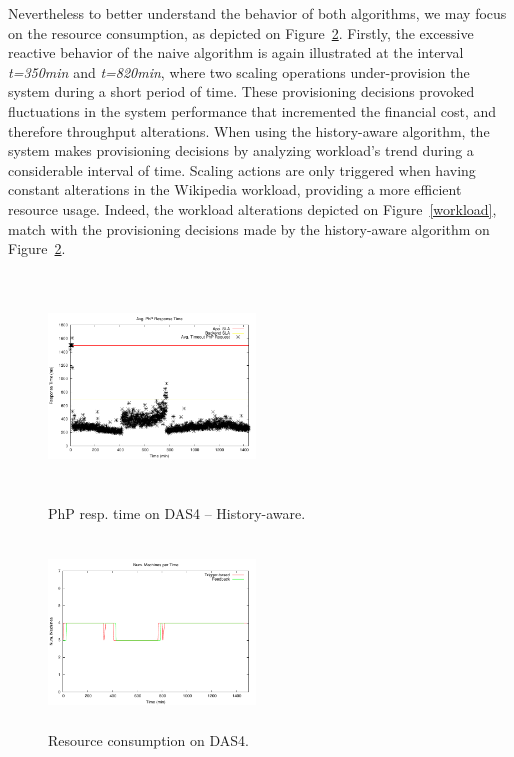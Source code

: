 Nevertheless to better understand the behavior of both algorithms, we may focus on the resource consumption, as depicted on Figure~\ref{resComDas4}. Firstly, the excessive reactive behavior of the naive algorithm is again illustrated at the interval \emph{t=350min} and \emph{t=820min}, where two scaling operations under-provision the system during a short period of time. These provisioning decisions provoked fluctuations in the system performance that incremented the financial cost, and therefore throughput alterations. When using the history-aware algorithm, the system makes provisioning decisions by analyzing workload's trend during a considerable interval of time. Scaling actions are only triggered when having constant alterations in the Wikipedia workload, providing a more efficient resource usage. Indeed, the workload alterations depicted on Figure~\ref{workload}, match with the provisioning decisions made by the history-aware algorithm on Figure~\ref{resComDas4}.

\begin{figure}
\begin{center}
\includegraphics[width=0.49\textwidth, height=6cm]{./images/homogeneous/avgTimeout_PhP_history}
\end{center}
\caption{PhP resp. time on DAS4 -- History-aware.}
\label{historyDas4}
\end{figure}


\begin{figure}
\begin{center}
\includegraphics[width=0.49\textwidth, height=5cm]{./images/homogeneous/numMachinesComp}
\end{center}
\caption{Resource consumption on DAS4.}
\label{resComDas4}
\end{figure}

